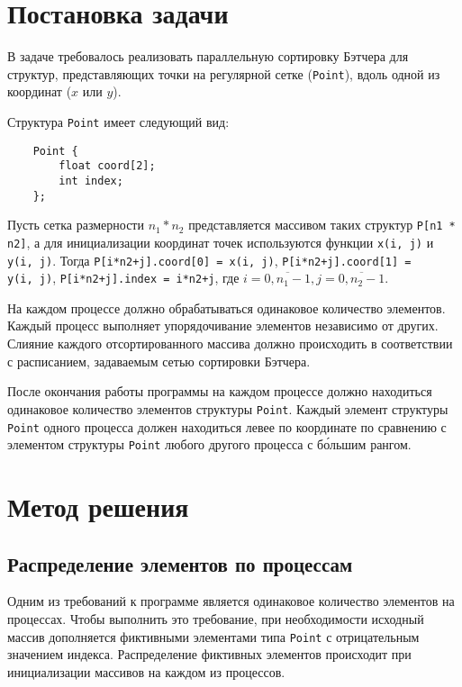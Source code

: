 \documentclass[oneside,final,14pt]{extreport}
\begin{document}
{\let\clearpage\relax \chapter*{Постановка задачи}}

В задаче требовалось реализовать параллельную сортировку Бэтчера для структур,
представляющих точки на регулярной сетке (\texttt{Point}), вдоль одной из
координат ($x$ или $y$).

Структура \texttt{Point} имеет следующий вид:
\begin{verbatim}
    Point {
        float coord[2];
        int index;
    };
\end{verbatim}

Пусть сетка размерности $n_1 * n_2$ представляется массивом таких структур
\texttt{P[n1 * n2]}, а для инициализации координат точек используются функции
\texttt{x(i,~j)} и \texttt{y(i,~j)}.
Тогда \texttt{P[i*n2+j].coord[0] = x(i,~j)},
\texttt{P[i*n2+j].coord[1] = y(i,~j)}, \texttt{P[i*n2+j].index = i*n2+j}, где $i = \overline{0, n_1-1},
j = \overline{0,n_2-1}$.

На каждом процессе должно обрабатываться одинаковое количество элементов.
Каждый процесс выполняет упорядочивание элементов независимо от других.
Слияние каждого отсортированного массива должно происходить в соответствии с
расписанием, задаваемым сетью сортировки Бэтчера.

После окончания работы программы на каждом процессе должно находиться одинаковое
количество элементов структуры \texttt{Point}. Каждый элемент структуры
\texttt{Point} одного процесса должен находиться левее по координате
по сравнению с элементом структуры \texttt{Point} любого другого процесса с
б\'{о}льшим рангом.

\chapter*{Метод решения}

\section*{Распределение элементов по процессам}

Одним из требований к программе является одинаковое количество элементов
на процессах. Чтобы выполнить это требование, при необходимости
исходный массив дополняется фиктивными элементами типа \texttt{Point} с
отрицательным значением индекса. Распределение фиктивных элементов происходит
при инициализации массивов на каждом из процессов.
\end{document}
